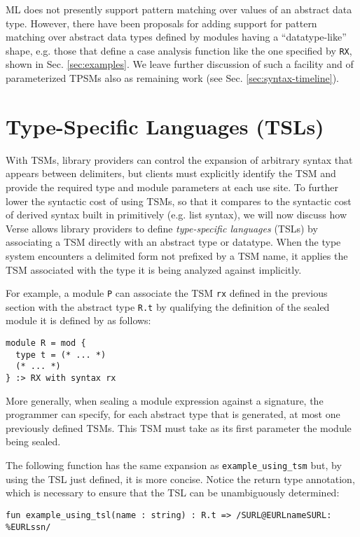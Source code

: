 ML does not presently support pattern matching over values of an abstract data type. However, there have been proposals for adding support for pattern matching over abstract data types defined by modules having a ``datatype-like'' shape, e.g. those that define a case analysis function like the one specified by \lstinline{RX}, shown in Sec. \ref{sec:examples}. We leave further discussion of such a facility and of parameterized TPSMs also as remaining work (see Sec. \ref{sec:syntax-timeline}). 

\section{Type-Specific Languages (TSLs)}\label{sec:tsls}
With TSMs, library providers can control the expansion of arbitrary syntax that appears between delimiters, but clients must explicitly identify the TSM and provide the required type and module parameters at each use site. To further lower the syntactic cost of using TSMs, so that it compares to the syntactic cost of derived syntax built in primitively (e.g. list syntax), we will now discuss how Verse allows library providers to define \emph{type-specific languages} (TSLs) by associating a TSM directly with an abstract type or datatype. When the type system encounters a delimited form not prefixed by a TSM name, it applies the TSM associated with the type it is being analyzed against implicitly.

For example, a module \lstinline{P} can associate the TSM \lstinline{rx} defined in the previous section with the abstract type \lstinline{R.t} by qualifying the definition of the sealed module it is defined by as follows:
\begin{lstlisting}[numbers=none]
module R = mod {
  type t = (* ... *)
  (* ... *)
} :> RX with syntax rx
\end{lstlisting}
More generally, when sealing a module expression against a signature, the programmer can specify, for each abstract type that is generated, at most one previously defined TSMs. This TSM must take as its first parameter the module being sealed.

The following function has the same expansion as \lstinline{example_using_tsm} but, by using the TSL just defined, it is more concise. Notice the return type annotation, which is necessary to ensure that the TSL can be unambiguously determined:
\begin{lstlisting}[numbers=none]
fun example_using_tsl(name : string) : R.t => /SURL@EURLnameSURL: %EURLssn/
\end{lstlisting}

